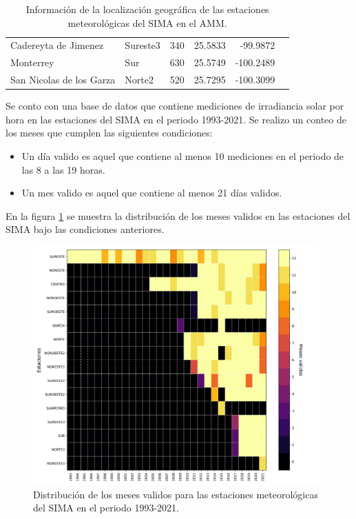 \begin{table}[H]
\begin{tabular}{llcrrr}
		Cadereyta de Jimenez     & Sureste3        & 340                                                                                       & 25.5833               & -99.9872               \\
		Monterrey                & Sur             & 630                                                                                       & 25.5749               & -100.2489              \\
		San Nicolas de los Garza & Norte2          & 520                                                                                       & 25.7295               & -100.3099              \\ \hline
	\end{tabular}
	\caption{Información de la localización geográfica de las estaciones meteorológicas del SIMA en el AMM.}
	\label{table:stations_information}
\end{table}

Se conto con una base de datos que contiene mediciones de irradiancia solar por hora en las estaciones del SIMA en el periodo 1993-2021. Se realizo un conteo de los meses que cumplen las siguientes condiciones:

\begin{itemize}
	\item Un día valido es aquel que contiene al menos 10 mediciones en el periodo de las 8 a las 19 horas.
	\item Un mes valido es aquel que contiene al menos 21 días validos.
\end{itemize}

En la figura \ref{fig:distribution_data} se muestra la distribución de los meses validos en las estaciones del SIMA bajo las condiciones anteriores.

\begin{figure}[H]
	\centering
	\includegraphics[width=11cm]{Graphics/Distribution_stations.png}
	\caption{Distribución de los meses validos para las estaciones meteorológicas del SIMA en el periodo 1993-2021.}
	\label{fig:distribution_data}
\end{figure}

